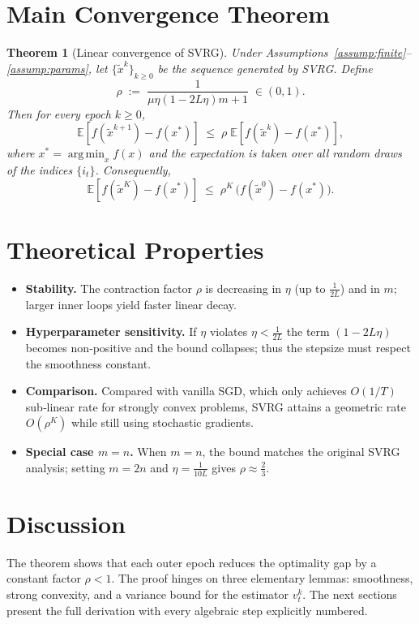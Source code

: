 \documentclass{article}
\newtheorem{theorem}{Theorem}
\newcommand{\E}{\mathbb{E}}
\newcommand{\argmin}{\operatorname*{arg\,min}}
\begin{document}
\section*{Main Convergence Theorem}
\begin{theorem}[Linear convergence of SVRG]\label{thm:linear}
Under Assumptions~\ref{assump:finite}–\ref{assump:params}, let $\{ \tilde{x}^{k}\}_{k\ge0}$ be the sequence generated by SVRG. Define
\[
\rho\;:=\;\frac{1}{\mu\eta(1-2L\eta)m+1}\;\in(0,1).
\]
Then for every epoch $k\ge0$,
\[
\E\!\left[ f(\tilde{x}^{k+1})-f(x^{*})\right]\;\le\;\rho\;\E\!\left[ f(\tilde{x}^{k})-f(x^{*})\right],
\]
where $x^{*}=\argmin_{x}f(x)$ and the expectation is taken over all random draws of the indices $\{i_t\}$.
Consequently,
\[
\E\!\left[ f(\tilde{x}^{K})-f(x^{*})\right]\;\le\;\rho^{K}\,\bigl(f(\tilde{x}^{0})-f(x^{*})\bigr).
\]
\end{theorem}

\section*{Theoretical Properties}
\begin{itemize}
\item \textbf{Stability.} The contraction factor $\rho$ is decreasing in $\eta$ (up to $\frac1{2L}$) and in $m$; larger inner loops yield faster linear decay.
\item \textbf{Hyperparameter sensitivity.} If $\eta$ violates $\eta<\frac1{2L}$ the term $(1-2L\eta)$ becomes non‑positive and the bound collapses; thus the stepsize must respect the smoothness constant.
\item \textbf{Comparison.} Compared with vanilla SGD, which only achieves $O(1/T)$ sub‑linear rate for strongly convex problems, SVRG attains a geometric rate $O(\rho^{K})$ while still using stochastic gradients.
\item \textbf{Special case $m=n$.} When $m=n$, the bound matches the original SVRG analysis; setting $m=2n$ and $\eta=\frac{1}{10L}$ gives $\rho\approx\frac{2}{3}$.
\end{itemize}

\section*{Discussion}
The theorem shows that each outer epoch reduces the optimality gap by a constant factor $\rho<1$. The proof hinges on three elementary lemmas: smoothness, strong convexity, and a variance bound for the estimator $v_t^{k}$. The next sections present the full derivation with every algebraic step explicitly numbered.
\end{document}
